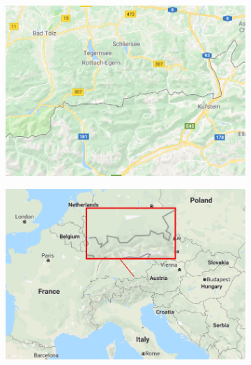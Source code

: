\documentclass{beamer}
\begin{document}
	\begin{frame}
		\begin{figure}
			\begin{subfigure}{0.49\textwidth}
				\includegraphics[width=\textwidth]{maps_zoom4.png}
			\end{subfigure}
			\begin{subfigure}{0.49\textwidth}
				\includegraphics[width=\textwidth]{maps_zoom1_red_box.png}
			\end{subfigure}
		\end{figure}
	\end{frame}
	
\end{document}
